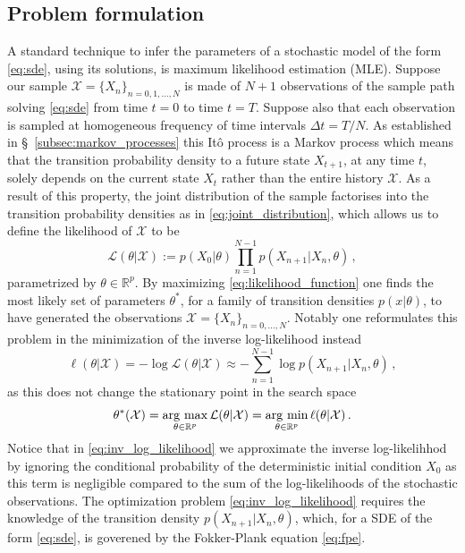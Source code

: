\subsection{Problem formulation}\label{subsec:formulation}
A standard technique to infer the parameters of a stochastic model of the form \eqref{eq:sde}, using its solutions, is maximum likelihood estimation (MLE).
Suppose our sample $\mathcal{X}=\{X_{n}\}_{n=0,1,\dots,N}$ is made of $N+1$ observations of the sample path solving \eqref{eq:sde} from time $t=0$ to time $t=T$.
Suppose also that each observation is sampled at homogeneous frequency of time intervals $\Delta t = T/N$.
As established in \S~\ref{subsec:markov_processes} this It\^{o} process is a Markov process which means that the transition probability density to a future state $X_{t+1}$, at any time $t$, solely depends on the current state $X_{t}$ rather than the entire history $\mathcal{X}$.
As a result of this property, the joint distribution of the sample factorises into the transition probability densities as in \eqref{eq:joint_distribution}, which allows us to define the likelihood of $\mathcal{X}$ to be
\begin{equation}\label{eq:likelihood_function}
        \mathcal{L}(\theta|\mathcal{X}) := p(X_{0}|\theta)\prod_{n=1}^{N-1}p(X_{n+1}|X_{n},\theta)\,,
\end{equation}
%
parametrized by $\theta\in\mathbb{R}^p$.
By maximizing \eqref{eq:likelihood_function} one finds the most likely set of parameters $\theta^{*}$, for a family of transition densities $p(x|\theta)$, to have generated the observations $\mathcal{X} = \{X_{n}\}_{n=0,\dots,N}$.
Notably one reformulates this problem in the minimization of the inverse log-likelihood instead
%
\begin{equation}\label{eq:inv_log_likelihood}
        \ell(\theta|\mathcal{X}) = -\log\mathcal{L}(\theta|\mathcal{X}) \approx -\sum_{n=1}^{N-1}\log p(X_{n+1}|X_{n},\theta) \,,
\end{equation}
%
as this does not change the stationary point in the search space
%
\begin{equation}\label{eq:mle}
        \theta^{*}(\mathcal{X}) = \operatorname*{\arg\,max}_{\theta\in \mathbb{R}^{p}}\mathcal{L}(\theta|\mathcal{X}) = \operatorname*{\arg\,min}_{\theta\in \mathbb{R}^{p}}\ell(\theta|\mathcal{X})\,.
\end{equation}
%
Notice that in \eqref{eq:inv_log_likelihood} we approximate the inverse log-likelihhod by ignoring the conditional probability of the deterministic initial condition $X_{0}$ as this term is negligible compared to the sum of the log-likelihoods of the stochastic observations. 
The optimization problem \eqref{eq:inv_log_likelihood} requires the knowledge of the transition density $p(X_{n+1}|X_{n},\theta)$, which, for a SDE of the form \eqref{eq:sde}, is goverened by the Fokker-Plank equation \eqref{eq:fpe}.

